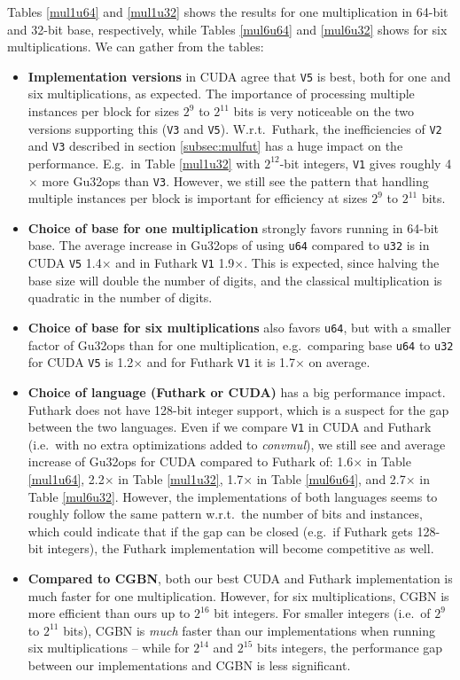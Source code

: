 Tables \ref{mul1u64} and \ref{mul1u32} shows the results for one multiplication
in 64-bit and 32-bit base, respectively, while Tables \ref{mul6u64} and
\ref{mul6u32} shows for six multiplications. We can gather from the tables:
\begin{itemize}
  \renewcommand\labelitemi{--}
\item \textbf{Implementation versions} in CUDA agree that \texttt{V5} is best,
  both for one and six multiplications, as expected. The importance of
  processing multiple instances per block for sizes $2^9$ to $2^{11}$ bits is
  very noticeable on the two versions supporting this (\texttt{V3} and
  \texttt{V5}). W.r.t.\ Futhark, the inefficiencies of \texttt{V2} and
  \texttt{V3} described in section \ref{subsec:mulfut} has a huge impact on the
  performance. E.g.\ in Table \ref{mul1u32} with $2^{12}$-bit integers,
  \texttt{V1} gives roughly 4$\times$ more Gu32ops than \texttt{V3}. However, we
  still see the pattern that handling multiple instances per block is important
  for efficiency at sizes $2^9$ to $2^{11}$ bits.
\item \textbf{Choice of base for one multiplication} strongly favors running in
  64-bit base. The average increase in Gu32ops of using \texttt{u64} compared to
  \texttt{u32} is in CUDA \texttt{V5} 1.4$\times$ and in Futhark \texttt{V1}
  1.9$\times$. This is expected, since halving the base size will double the number
  of digits, and the classical multiplication is quadratic in the number of
  digits.
\item \textbf{Choice of base for six multiplications} also favors \texttt{u64},
  but with a smaller factor of Gu32ops than for one multiplication, e.g.\
  comparing base \texttt{u64} to \texttt{u32} for CUDA \texttt{V5} is
  1.2$\times$ and for Futhark \texttt{V1} it is 1.7$\times$ on average.
\item \textbf{Choice of language (Futhark or CUDA)} has a big performance
  impact. Futhark does not have 128-bit integer support, which is a suspect for
  the gap between the two languages. Even if we compare \texttt{V1} in CUDA and
  Futhark (i.e.\ with no extra optimizations added to \textit{convmul}), we
  still see and average increase of Gu32ops for CUDA compared to Futhark of:
  1.6$\times$ in Table \ref{mul1u64}, 2.2$\times$ in Table \ref{mul1u32},
  1.7$\times$ in Table \ref{mul6u64}, and 2.7$\times$ in Table \ref{mul6u32}. However, the
  implementations of both languages seems to roughly follow the same pattern
  w.r.t.\ the number of bits and instances, which could indicate that if the gap
  can be closed (e.g.\ if Futhark gets 128-bit integers), the Futhark
  implementation will become competitive as well.
\item \textbf{Compared to CGBN}, both our best CUDA and Futhark implementation
  is much faster for one multiplication. However, for six multiplications, CGBN
  is more efficient than ours up to $2^{16}$ bit integers. For smaller integers
  (i.e.\ of $2^9$ to $2^{11}$ bits), CGBN is \textit{much} faster than our
  implementations when running six multiplications -- while for $2^{14}$ and
  $2^{15}$ bits integers, the performance gap between our implementations and
  CGBN is less significant.
\end{itemize}

